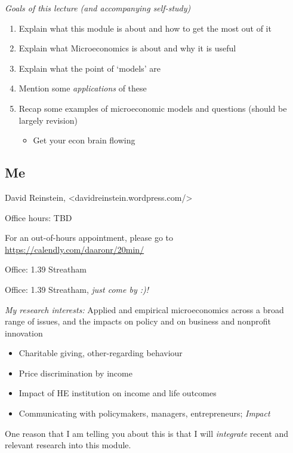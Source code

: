 \documentclass[]{article}
\providecommand{\tightlist}{%
  \setlength{\itemsep}{0pt}\setlength{\parskip}{0pt}}
\begin{document}
\emph{Goals of this lecture (and accompanying self-study)}

\begin{enumerate}
\def\labelenumi{\arabic{enumi}.}
\tightlist
\item
  Explain what this module is about and how to get the most out of it
\item
  Explain what Microeconomics is about and why it is useful
\item
  Explain what the point of `models' are
\item
  Mention some \emph{applications} of these
\item
  Recap some examples of microeconomic models and questions (should be
  largely revision)

  \begin{itemize}
  \tightlist
  \item
    Get your econ brain flowing
  \end{itemize}
\end{enumerate}

\hypertarget{me}{%
\subsection{Me}\label{me}}

David Reinstein, \textless davidreinstein.wordpress.com/\textgreater{}

Office hours: TBD

For an out-of-hours appointment, please go to
\url{https://calendly.com/daaronr/20min/}

Office: 1.39 Streatham

Office: 1.39 Streatham, \emph{just come by :)!}

\bigskip

\emph{My research interests:} Applied and empirical microeconomics
across a broad range of issues, and the impacts on policy and on
business and nonprofit innovation

\begin{itemize}
\tightlist
\item
  Charitable giving, other-regarding behaviour
\item
  Price discrimination by income
\item
  Impact of HE institution on income and life outcomes
\item
  Communicating with policymakers, managers, entrepreneurs;
  \emph{Impact}
\end{itemize}

One reason that I am telling you about this is that I will
\emph{integrate} recent and relevant research into this module.
\end{document}
